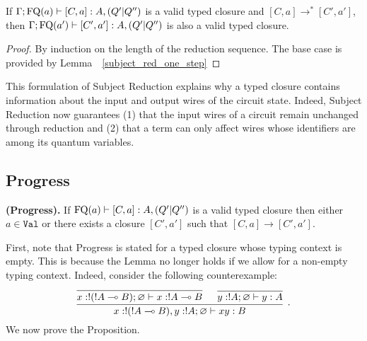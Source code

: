 \documentclass[twoside]{article}
\begin{document}
\begin{corollary}
If $\Gamma;\mathop{\textrm{FQ}}\nolimits(a)\vdash [C,a]:A,(Q'|Q'')$ is a valid typed closure 
and $[C,a]\to^* [C',a']$, then $\Gamma;\mathop{\textrm{FQ}}\nolimits(a')\vdash [C',a']:A,(Q'|Q'')$ 
is also a valid typed closure.
\end{corollary}

\begin{proof}
By induction on the length of the reduction sequence. The base case is 
provided by Lemma~~\hyperref[subject_red_one_step]{\ref*{subject_red_one_step}}
\end{proof}

This formulation of Subject Reduction explains why a typed closure contains 
information about the input and output wires of the circuit state. Indeed, 
Subject Reduction now guarantees (1) that the input wires of a circuit 
remain unchanged through reduction and (2) that a term can only affect 
wires whose identifiers are among its quantum variables.

\subsection{Progress}

\begin{proposition}
{\bf (Progress).}
If $\mathop{\textrm{FQ}}\nolimits(a)\vdash [C,a]:A,(Q'|Q'')$ is a valid typed closure then either 
$a\in\mathtt{Val}$ or there exists a closure $[C',a']$ such that 
$[C,a]\to [C',a']$.
\end{proposition}

First, note that Progress is stated for a typed closure whose typing 
context is empty. This is because the Lemma no longer holds if we allow 
for a non-empty typing context. Indeed, consider the following counterexample:
\[
\infer[.]{x:!(!A\loli B), y:!A;\varnothing\entails xy:B}{
 \infer[]{x:!(!A\loli B);\varnothing\entails x:!A\loli B}{ 
 }
 &
 \infer[]{y:!A;\varnothing\entails y:A}{ 
 }
}
\]
We now prove the Proposition.
\end{document}
